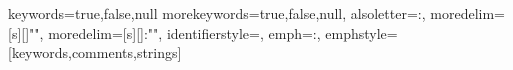 \makeatletter
\ifdefined\@UsingAppendix
\usepackage[titletoc]{appendix}
\renewcommand\appendixname{附录}
\renewcommand\appendixpagename{附录}
\appendixtitleon
\else
\relax
\fi
\makeatother

\makeatletter
\ifdefined\@RequestArgColor
\def\reqargclr#1{\item[{\colorbox[rgb]{1.00,0.90,1.00}{#1}}]}
\fi
\makeatother


\makeatletter

\ifdefined\@FootnoteWithPage
\usepackage{chngcntr}
\renewcommand\thefootnote{\theparagraph-\alph{footnote}}
\fi
\makeatother


\makeatletter
\ifdefined\@NoPackageListings
\relax
\else
\ifdefined\@lst@json@define
{}
{
    keywords={true,false,null}
}
\fi
{}%
{
    morekeywords={true,false,null},%
    alsoletter={:},
    moredelim=[s][{\color[rgb]{0.67,0.00,0.67}}]{"}{"},
    moredelim=[s][{\color[rgb]{0.36,0.67,0.78}}]{:"}{"},%
    identifierstyle=\color{blue},
    emph={:}, emphstyle=\color{red}
}[keywords,comments,strings]%
\fi
\makeatother
